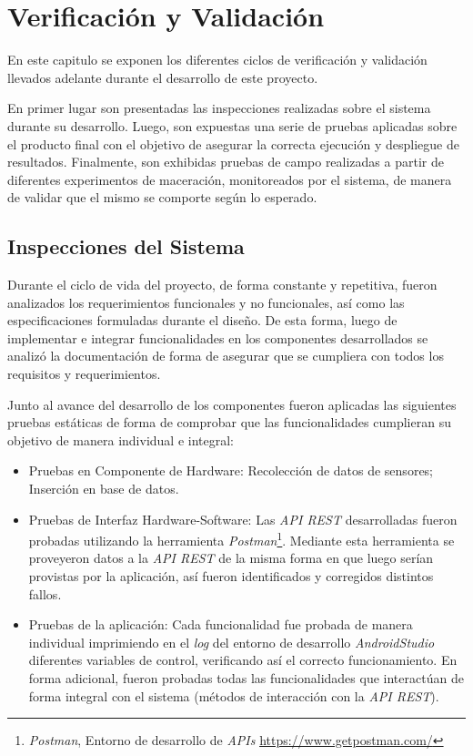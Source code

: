 \chapter{Verificación y Validación}
\par En este capitulo se exponen los diferentes ciclos de verificación y validación llevados adelante durante el desarrollo de este proyecto.
\par En primer lugar son presentadas las inspecciones realizadas sobre el sistema durante su desarrollo. Luego, son expuestas una serie de pruebas aplicadas sobre el producto final con el objetivo de asegurar la correcta ejecución y despliegue de resultados. Finalmente, son exhibidas pruebas de campo realizadas a partir de diferentes experimentos de maceración, monitoreados por el sistema, de manera de validar que el mismo se comporte según lo esperado.

\section{Inspecciones del Sistema}

Durante el ciclo de vida del proyecto, de forma constante y repetitiva, fueron analizados los requerimientos funcionales y no funcionales, así como las especificaciones formuladas durante el diseño. De esta forma, luego de implementar e integrar funcionalidades en los componentes desarrollados se analizó la documentación de forma de asegurar que se cumpliera con todos los requisitos y requerimientos.
\par Junto al avance del desarrollo de los componentes fueron aplicadas las siguientes pruebas estáticas de forma de comprobar que las funcionalidades cumplieran su objetivo de manera individual e integral:
\begin{itemize}
    \item Pruebas en Componente de Hardware: Recolección de datos de sensores; Inserción en base de datos.
    \item Pruebas de Interfaz Hardware-Software: Las \textit{API REST} desarrolladas fueron probadas utilizando la herramienta \textit{Postman}\footnote{\textit{Postman}, Entorno de desarrollo de \textit{APIs} \url{https://www.getpostman.com/}}. Mediante esta herramienta se proveyeron datos a la \textit{API REST} de la misma forma en que luego serían provistas por la aplicación, así fueron identificados y corregidos distintos fallos.
    \item Pruebas de la aplicación: Cada funcionalidad fue probada de manera individual imprimiendo en el \textit{log} del entorno de desarrollo \textit{AndroidStudio} diferentes variables de control, verificando así el correcto funcionamiento. En forma adicional, fueron probadas todas las funcionalidades que interactúan de forma integral con el sistema (métodos de interacción con la \textit{API REST}).
\end{itemize}

